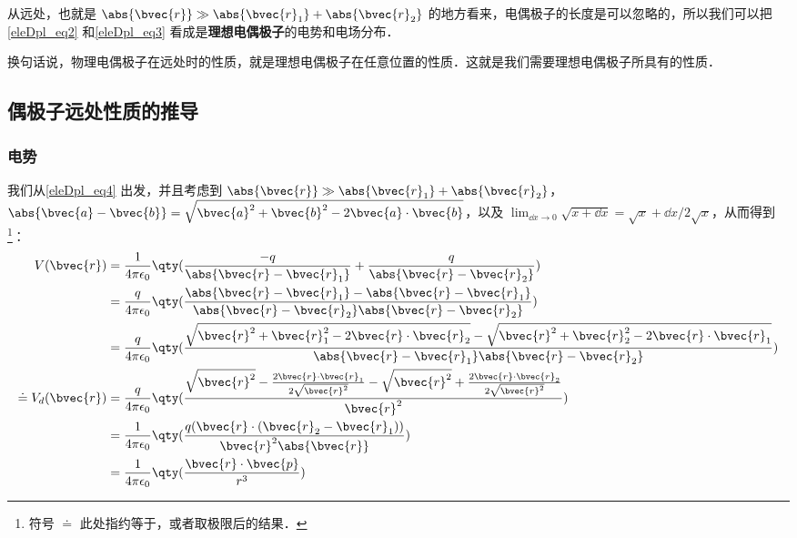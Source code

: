 从远处，也就是 $\abs{\bvec{r}}\gg\\\abs{\bvec{r}_1}+\abs{\bvec{r}_2}$ 的地方看来，电偶极子的长度是可以忽略的，所以我们可以把\autoref{eleDpl_eq2} 和\autoref{eleDpl_eq3} 看成是\textbf{理想电偶极子}的电势和电场分布．

换句话说，物理电偶极子在远处时的性质，就是理想电偶极子在任意位置的性质．这就是我们需要理想电偶极子所具有的性质．



\subsection{偶极子远处性质的推导}

\subsubsection{电势}

我们从\autoref{eleDpl_eq4} 出发，并且考虑到 $\abs{\bvec{r}}\gg\\\abs{\bvec{r}_1}+\abs{\bvec{r}_2}$，$\abs{\bvec{a}-\bvec{b}}=\sqrt{\bvec{a}^2+\bvec{b}^2-2\bvec{a}\cdot\bvec{b}}$，以及 $\lim_{\dd x\rightarrow 0}\sqrt{x+\dd x}=\sqrt{x}+\dd x/2\sqrt{x}$，从而得到\footnote{符号 $\doteq$ 此处指约等于，或者取极限后的结果．}：
\begin{equation}
\begin{aligned}
V(\bvec{r})&=\frac{1}{4\pi\epsilon_0}\qty(\frac{-q}{\abs{\bvec{r}-\bvec{r}_1}}+\frac{q}{\abs{\bvec{r}-\bvec{r}_2}})\\
&=\frac{q}{4\pi\epsilon_0}\qty(\frac{\abs{\bvec{r}-\bvec{r}_1}-\abs{\bvec{r}-\bvec{r}_1}}{\abs{\bvec{r}-\bvec{r}_2}\abs{\bvec{r}-\bvec{r}_2}})\\
&=\frac{q}{4\pi\epsilon_0}\qty(\frac{\sqrt{\bvec{r}^2+\bvec{r}_1^2-2\bvec{r}\cdot\bvec{r}_2}-\sqrt{\bvec{r}^2+\bvec{r}_2^2-2\bvec{r}\cdot\bvec{r}_1}}{\abs{\bvec{r}-\bvec{r}_1}\abs{\bvec{r}-\bvec{r}_2}})\\
\doteq V_d(\bvec{r})&=\frac{q}{4\pi\epsilon_0}\qty(\frac{\sqrt{\bvec{r}^2}-\frac{2\bvec{r}\cdot\bvec{r}_1}{2\sqrt{\bvec{r}^2}}-\sqrt{\bvec{r}^2}+\frac{2\bvec{r}\cdot\bvec{r}_2}{2\sqrt{\bvec{r}^2}}}{\bvec{r}^2})\\
&=\frac{1}{4\pi\epsilon_0}\qty(\frac{q(\bvec{r}\cdot(\bvec{r}_2-\bvec{r}_1))}{\bvec{r}^2\abs{\bvec{r}}})\\
&=\frac{1}{4\pi\epsilon_0}\qty(\frac{\bvec{r}\cdot\bvec{p}}{r^3})
\end{aligned}
\end{equation}



